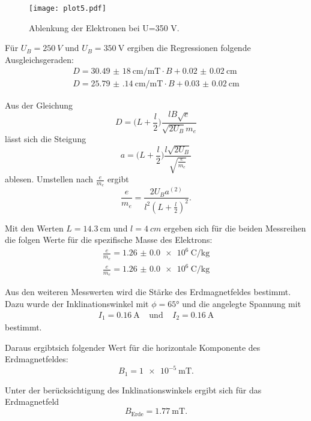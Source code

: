 \begin{figure}
  \centering
  \texttt{[image: plot5.pdf]}
  \caption{Ablenkung der Elektronen bei U=350\; V.}
  \label{fig:plot5}
\end{figure}

Für $U_{B}=\SI{250}{V}$ und $U_{B}=\SI{350}{\V}$ ergiben die Regressionen folgende Ausgleichsgeraden:
\begin{align*}
  D=\SI{30,49(18)}{\centi\meter\per\milli\tesla}\cdot B+\SI{0.02(2)}{\centi\meter}\\
  D=\SI{25.79(14)}{\centi\meter\per\milli\tesla}\cdot B+\SI{0.03(2)}{\centi\meter}
\end{align*}


Aus der Gleichung
\begin{equation}
  D=\biggl(L+\frac{l}{2}\biggr)\frac{lB\sqrt{e}}{\sqrt{2U_B}m_e}
\end{equation}
lässt sich die Steigung
\begin{equation}
  a=\biggl(L+\frac{l}{2}\biggr)\frac{l\sqrt{2U_B}}{\sqrt{\frac{e}{m_e}}}
  \label{eqn:steig}
\end{equation}
ablesen. Umstellen nach $\frac{e}{m_e}$
ergibt
\begin{equation}
  \frac{e}{m_e}= \frac{2U_{B} a^(2)}{l^{2}(L+\frac{l}{2})^{2}}.
  \label{em}
\end{equation}

Mit den Werten $L=\SI{14,3}{\cm}$ und $l=\SI{4}{cm}$ ergeben sich für die
beiden Messreihen die folgen Werte für die spezifische Masse des Elektrons:
\begin{align*}
  \frac{e}{m_e}=\SI{1.26(0)e6}{\coulomb\per\kg}\\
  \frac{e}{m_e}=\SI{1.26(0)e6}{\coulomb\per\kg}
\end{align*}




Aus den weiteren Messwerten wird die Stärke des Erdmagnetfeldes bestimmt. Dazu wurde der
Inklinationswinkel mit $\phi=65°$ und die angelegte Spannung mit
\begin{align*}
  I_1=\SI{0,16}{\A} \;\;\;\;\text{und}\;\;\;\; I_2=\SI{0,16}{\A}
\end{align*}
bestimmt.

Daraus ergibtsich folgender Wert für die horizontale Komponente des Erdmagnetfeldes:
\begin{equation*}
  B_1=\SI{1e-5}{\milli\tesla}.
\end{equation*}


Unter der berücksichtigung des Inklinationswinkels ergibt sich für das
Erdmagnetfeld
\begin{equation*}
  B_\text{Erde}=\SI{1,77}{\milli\tesla}.
\end{equation*}

